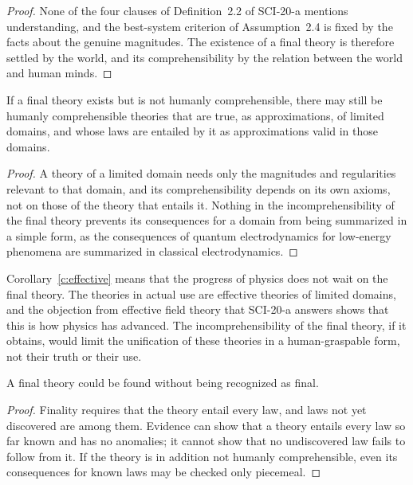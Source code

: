 \documentclass{situationist-preprint}
\begin{document}
\begin{proof}
None of the four clauses of Definition~2.2 of SCI-20-a mentions understanding, and the best-system criterion of Assumption~2.4 is fixed by the facts about the genuine magnitudes. The existence of a final theory is therefore settled by the world, and its comprehensibility by the relation between the world and human minds.
\end{proof}

\begin{corollary}\label{c:effective}
If a final theory exists but is not humanly comprehensible, there may still be humanly comprehensible theories that are true, as approximations, of limited domains, and whose laws are entailed by it as approximations valid in those domains.
\end{corollary}

\begin{proof}
A theory of a limited domain needs only the magnitudes and regularities relevant to that domain, and its comprehensibility depends on its own axioms, not on those of the theory that entails it. Nothing in the incomprehensibility of the final theory prevents its consequences for a domain from being summarized in a simple form, as the consequences of quantum electrodynamics for low-energy phenomena are summarized in classical electrodynamics.
\end{proof}

Corollary~\ref{c:effective} means that the progress of physics does not wait on the final theory. The theories in actual use are effective theories of limited domains, and the objection from effective field theory that SCI-20-a answers shows that this is how physics has advanced. The incomprehensibility of the final theory, if it obtains, would limit the unification of these theories in a human-graspable form, not their truth or their use.

\begin{corollary}\label{c:recognition}
A final theory could be found without being recognized as final.
\end{corollary}

\begin{proof}
Finality requires that the theory entail every law, and laws not yet discovered are among them. Evidence can show that a theory entails every law so far known and has no anomalies; it cannot show that no undiscovered law fails to follow from it. If the theory is in addition not humanly comprehensible, even its consequences for known laws may be checked only piecemeal.
\end{proof}
\end{document}
